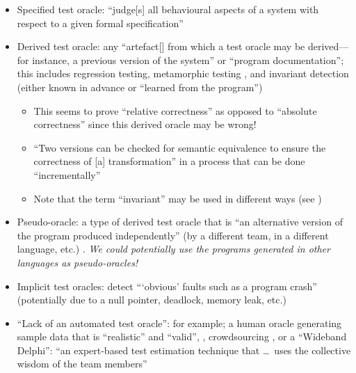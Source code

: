 \begin{itemize}
    \item Specified test oracle: ``judge[s] all behavioural aspects of a
          system with respect to a given formal specification''
          \citep[p.~510]{BarrEtAl2015}
    \item Derived test oracle: any ``artefact[] from which a
          test oracle may be derived---for instance, a previous version of
          the system'' or ``program documentation''; this includes regression
          testing, metamorphic testing \citep[p.~510]{BarrEtAl2015}, and
          invariant detection (either known in advance or ``learned from the
          program'') \citep[p.~516]{BarrEtAl2015}
          \begin{itemize}
              \item This seems to prove ``relative correctness'' as
                    opposed to ``absolute correctness''
                    \citep[p.~345]{LahiriEtAl2013} since this derived
                    oracle may be wrong!
              \item ``Two versions can be checked for semantic equivalence
                    to ensure the correctness of [a] transformation'' in a
                    process that can be done ``incrementally''
                    \citep[p.~345]{LahiriEtAl2013}
              \item Note that the term ``invariant'' may be used in
                    different ways (see \citep[p.~348]{ChalinEtAl2006})
          \end{itemize}
    \item Pseudo-oracle: a type of derived test oracle that is ``an
          alternative version of the program produced independently'' (by a
          different team, in a different language, etc.)
          \citep[p.~515]{BarrEtAl2015} .
          \emph{We could potentially use the
              programs generated in other languages as pseudo-oracles!}
    \item Implicit test oracles: detect ```obvious' faults such as a program
          crash'' (potentially due to a null pointer, deadlock, memory leak,
          etc.) \citep[p.~510]{BarrEtAl2015}
    \item ``Lack of an automated test oracle'': for example; a human oracle
          generating sample data that is ``realistic'' and ``valid'',
          \citep[pp.~510-511]{BarrEtAl2015}, crowdsourcing
          \citep[p.~520]{BarrEtAl2015}, or a ``Wideband Delphi'': ``an
          expert-based test estimation technique that \dots\ uses the
          collective wisdom of the team members'' \citepISTQB{}
\end{itemize}

